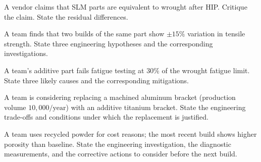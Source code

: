 \begin{exercise}
A vendor claims that SLM parts are equivalent to wrought after HIP. Critique the claim. State the residual differences.
\end{exercise}

\begin{exercise}
A team finds that two builds of the same part show $\pm 15\%$ variation in tensile strength. State three engineering hypotheses and the corresponding investigations.
\end{exercise}

\begin{exercise}
A team's additive part fails fatigue testing at $30\%$ of the wrought fatigue limit. State three likely causes and the corresponding mitigations.
\end{exercise}

\begin{exercise}
A team is considering replacing a machined aluminum bracket (production volume $10{,}000/\text{year}$) with an additive titanium bracket. State the engineering trade-offs and conditions under which the replacement is justified.
\end{exercise}

\begin{exercise}
A team uses recycled powder for cost reasons; the most recent build shows higher porosity than baseline. State the engineering investigation, the diagnostic measurements, and the corrective actions to consider before the next build.
\end{exercise}
